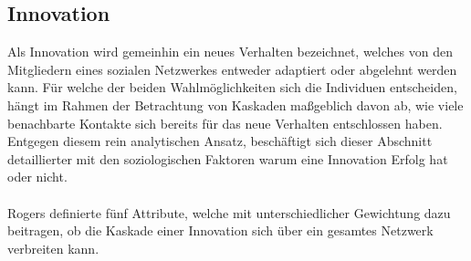 \documentclass[12pt]{article}
\begin{document}
\subsection{Innovation}
Als Innovation wird gemeinhin ein neues Verhalten bezeichnet, welches von den Mitgliedern eines sozialen Netzwerkes entweder adaptiert oder abgelehnt werden kann. Für welche der beiden Wahlmöglichkeiten sich die Individuen entscheiden, hängt im Rahmen der Betrachtung von Kaskaden maßgeblich davon ab, wie viele benachbarte Kontakte sich bereits für das neue Verhalten entschlossen haben. Entgegen diesem rein analytischen Ansatz, beschäftigt sich dieser Abschnitt detaillierter mit den soziologischen Faktoren warum eine Innovation Erfolg hat oder nicht.\\\\
Rogers definierte fünf Attribute, welche mit unterschiedlicher Gewichtung dazu beitragen, ob die Kaskade einer Innovation sich über ein gesamtes Netzwerk verbreiten kann.
\end{document}
